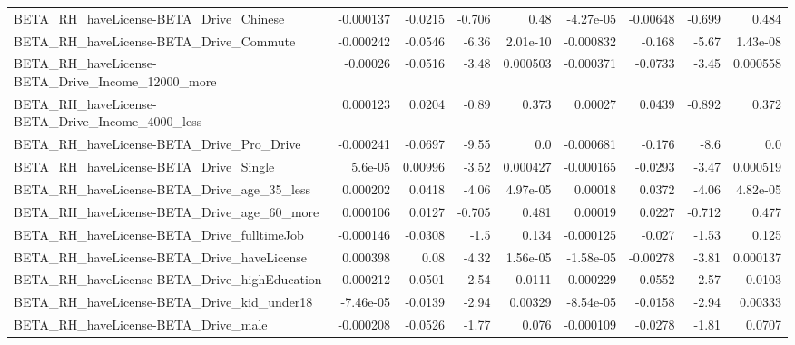 \begin{tabular}{lrrrrrrrr}
BETA\_RH\_haveLicense-BETA\_Drive\_Chinese             &   -0.000137 &      -0.0215 &    -0.706 &     0.48 &  -4.27e-05 &    -0.00648 &       -0.699 &         0.484 \\
BETA\_RH\_haveLicense-BETA\_Drive\_Commute             &   -0.000242 &      -0.0546 &     -6.36 & 2.01e-10 &  -0.000832 &      -0.168 &        -5.67 &      1.43e-08 \\
BETA\_RH\_haveLicense-BETA\_Drive\_Income\_12000\_more   &    -0.00026 &      -0.0516 &     -3.48 & 0.000503 &  -0.000371 &     -0.0733 &        -3.45 &      0.000558 \\
BETA\_RH\_haveLicense-BETA\_Drive\_Income\_4000\_less    &    0.000123 &       0.0204 &     -0.89 &    0.373 &    0.00027 &      0.0439 &       -0.892 &         0.372 \\
BETA\_RH\_haveLicense-BETA\_Drive\_Pro\_Drive           &   -0.000241 &      -0.0697 &     -9.55 &      0.0 &  -0.000681 &      -0.176 &         -8.6 &           0.0 \\
BETA\_RH\_haveLicense-BETA\_Drive\_Single              &     5.6e-05 &      0.00996 &     -3.52 & 0.000427 &  -0.000165 &     -0.0293 &        -3.47 &      0.000519 \\
BETA\_RH\_haveLicense-BETA\_Drive\_age\_35\_less         &    0.000202 &       0.0418 &     -4.06 & 4.97e-05 &    0.00018 &      0.0372 &        -4.06 &      4.82e-05 \\
BETA\_RH\_haveLicense-BETA\_Drive\_age\_60\_more         &    0.000106 &       0.0127 &    -0.705 &    0.481 &    0.00019 &      0.0227 &       -0.712 &         0.477 \\
BETA\_RH\_haveLicense-BETA\_Drive\_fulltimeJob         &   -0.000146 &      -0.0308 &      -1.5 &    0.134 &  -0.000125 &      -0.027 &        -1.53 &         0.125 \\
BETA\_RH\_haveLicense-BETA\_Drive\_haveLicense         &    0.000398 &         0.08 &     -4.32 & 1.56e-05 &  -1.58e-05 &    -0.00278 &        -3.81 &      0.000137 \\
BETA\_RH\_haveLicense-BETA\_Drive\_highEducation       &   -0.000212 &      -0.0501 &     -2.54 &   0.0111 &  -0.000229 &     -0.0552 &        -2.57 &        0.0103 \\
BETA\_RH\_haveLicense-BETA\_Drive\_kid\_under18         &   -7.46e-05 &      -0.0139 &     -2.94 &  0.00329 &  -8.54e-05 &     -0.0158 &        -2.94 &       0.00333 \\
BETA\_RH\_haveLicense-BETA\_Drive\_male                &   -0.000208 &      -0.0526 &     -1.77 &    0.076 &  -0.000109 &     -0.0278 &        -1.81 &        0.0707 \\

\end{tabular}
